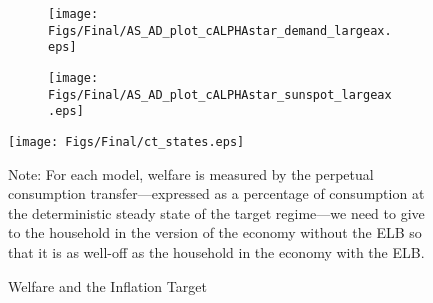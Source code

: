 \documentclass[11pt]{article}
\begin{document}
	
	\begin{figure}[t]
		\caption{AD and AS Curves in the Crisis State and in the Deflationary Regime} \label{fig:ASAD}
		\begin{center}
			\begin{subfigure}[b]{0.4\textwidth}
				\centering
				\texttt{[image: Figs/Final/AS\_AD\_plot\_cALPHAstar\_demand\_largeax.eps]}
			\end{subfigure}
		    \hspace{0.5cm}  
			\begin{subfigure}[b]{0.4\textwidth}
				\centering
				\texttt{[image: Figs/Final/AS\_AD\_plot\_cALPHAstar\_sunspot\_largeax.eps]}
			\end{subfigure}
		\end{center}
	\end{figure}
	
	\begin{figure}[!h]
		\begin{center}
			\caption{Welfare and the Inflation Target\label{fig:Welfare_Stylized}}
			\texttt{[image: Figs/Final/ct\_states.eps]}\\
		\end{center}
		\footnotesize{Note: For each model, welfare is measured by the perpetual consumption transfer---expressed as a percentage of consumption at the deterministic steady state of the target regime---we need to give to the household in the version of the economy without the ELB so that it is as well-off as the household in the economy with the ELB.}
	\end{figure}
	
\end{document}
